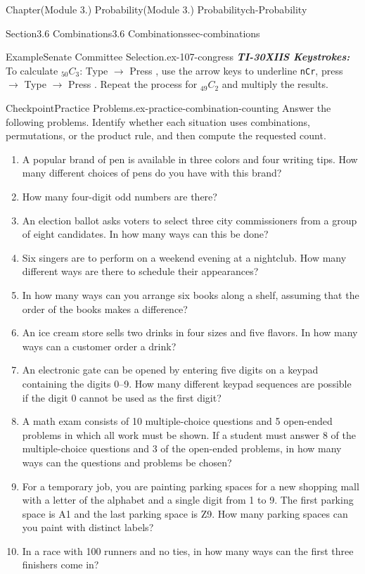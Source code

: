 \documentclass[oneside,10pt,]{book}
\newcommand{\mono}[1]{\texttt{#1}}
\newcommand{\alert}[1]{\textbf{\textit{#1}}}
\newcommand{\kbd}[1]{\keys{{#1}}}
\begin{document}
\begin{chapterptx}{Chapter}{(Module 3.) Probability}{}{(Module 3.) Probability}{}{}{ch-Probability}
\begin{sectionptx}{Section}{3.6 Combinations}{}{3.6 Combinations}{}{}{sec-combinations}
\begin{example}{Example}{Senate Committee Selection.}{ex-107-congress}
\alert{TI-30XIIS Keystrokes:} To calculate \({}_{50} C_3\): Type \kbd{50} \(\rightarrow\) Press \kbd{PRB}, use the arrow keys to underline \mono{nCr}, press \kbd{ENTER} \(\rightarrow\) Type \kbd{3} \(\rightarrow\) Press \kbd{ENTER}. Repeat the process for \({}_{49} C_2\) and multiply the results.%
\end{example}
\begin{inlineexercise}{Checkpoint}{Practice Problems.}{ex-practice-combination-counting}%
Answer the following problems. Identify whether each situation uses combinations, permutations, or the product rule, and then compute the requested count.%
%
\begin{enumerate}
\item{}A popular brand of pen is available in three colors and four writing tips. How many different choices of pens do you have with this brand?%
\item{}How many four-digit odd numbers are there?%
\item{}An election ballot asks voters to select three city commissioners from a group of eight candidates. In how many ways can this be done?%
\item{}Six singers are to perform on a weekend evening at a nightclub. How many different ways are there to schedule their appearances?%
\item{}In how many ways can you arrange six books along a shelf, assuming that the order of the books makes a difference?%
\item{}An ice cream store sells two drinks in four sizes and five flavors. In how many ways can a customer order a drink?%
\item{}An electronic gate can be opened by entering five digits on a keypad containing the digits 0–9. How many different keypad sequences are possible if the digit 0 cannot be used as the first digit?%
\item{}A math exam consists of 10 multiple-choice questions and 5 open-ended problems in which all work must be shown. If a student must answer 8 of the multiple-choice questions and 3 of the open-ended problems, in how many ways can the questions and problems be chosen?%
\item{}For a temporary job, you are painting parking spaces for a new shopping mall with a letter of the alphabet and a single digit from 1 to 9. The first parking space is A1 and the last parking space is Z9. How many parking spaces can you paint with distinct labels?%
\item{}In a race with 100 runners and no ties, in how many ways can the first three finishers come in?%

\end{enumerate}
\end{inlineexercise}
\end{sectionptx}
\end{chapterptx}
\end{document}
